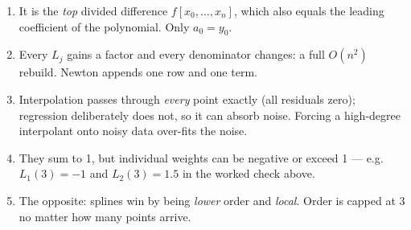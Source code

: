 \begin{trapbox}
\begin{enumerate}
      difference is $2$ --- a genuine cubic.
\item {}
      It is the \emph{top} divided difference $f[x_0,\dots,x_n]$, which also equals the
      leading coefficient of the polynomial. Only $a_0=y_0$.
\item {}
      Every $L_j$ gains a factor and every denominator changes: a full $O(n^2)$ rebuild.
      Newton appends one row and one term.
\item {}
      Interpolation passes through \emph{every} point exactly (all residuals zero);
      regression deliberately does not, so it can absorb noise. Forcing a high-degree
      interpolant onto noisy data over-fits the noise.
\item {}
      They sum to 1, but individual weights can be negative or exceed 1 --- e.g.\
      $L_1(3)=-1$ and $L_2(3)=1.5$ in the worked check above.
\item {}
      The opposite: splines win by being \emph{lower} order and \emph{local}. Order is
      capped at 3 no matter how many points arrive.
\end{enumerate}
\end{trapbox}
